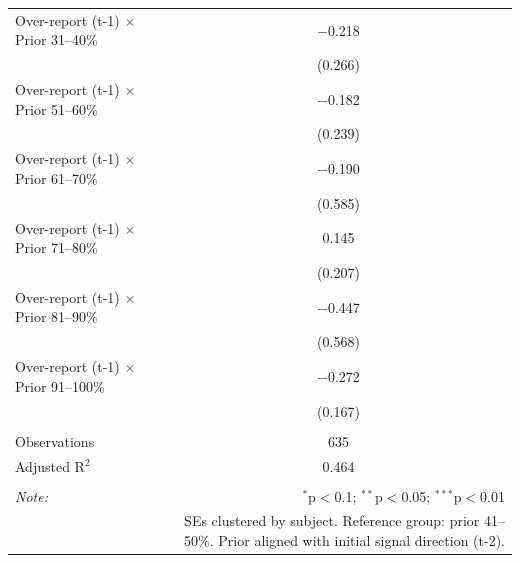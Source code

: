 \begin{table}[!htbp]
\begin{tabular}{@{\extracolsep{5pt}}lc}
  Over-report (t-1) $\times$ Prior 31--40\% & $-$0.218 \\ 
  & (0.266) \\ 
  Over-report (t-1) $\times$ Prior 51--60\% & $-$0.182 \\ 
  & (0.239) \\ 
  Over-report (t-1) $\times$ Prior 61--70\% & $-$0.190 \\ 
  & (0.585) \\ 
  Over-report (t-1) $\times$ Prior 71--80\% & 0.145 \\ 
  & (0.207) \\ 
  Over-report (t-1) $\times$ Prior 81--90\% & $-$0.447 \\ 
  & (0.568) \\ 
  Over-report (t-1) $\times$ Prior 91--100\% & $-$0.272 \\ 
  & (0.167) \\ 
 \hline \\[-1.8ex] 
Observations & 635 \\ 
Adjusted R$^{2}$ & 0.464 \\ 
\hline 
\hline \\[-1.8ex] 
\textit{Note:}  & \multicolumn{1}{r}{$^{*}$p$<$0.1; $^{**}$p$<$0.05; $^{***}$p$<$0.01} \\ 
 & \multicolumn{1}{r}{SEs clustered by subject. Reference group: prior 41--50\%. Prior aligned with initial signal direction (t-2).} \\ 
\end{tabular} 
\end{table} 
